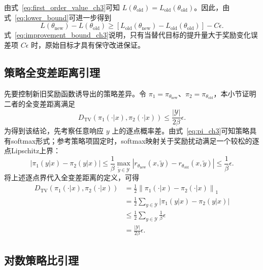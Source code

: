 由式~\eqref{eq:first_order_value_ch3}可知 $L(\theta_{\mathrm{old}})=L_{\mathrm{old}}(\theta_{\mathrm{old}})$。因此，由式~\eqref{eq:lower_bound}可进一步得到
\begin{equation}
    L(\theta_{\mathrm{new}})-L(\theta_{\mathrm{old}})
    \ge
    \left[
    L_{\mathrm{old}}(\theta_{\mathrm{new}})
    -
    L_{\mathrm{old}}(\theta_{\mathrm{old}})
    \right]
    -
    C\epsilon .
    \label{eq:improvement_bound_ch3}
\end{equation}
式~\eqref{eq:improvement_bound_ch3}说明，只有当替代目标的提升量大于奖励变化误差项 $C\epsilon$ 时，原始目标才具有保守改进保证。

\subsection{策略全变差距离引理}

先要控制新旧奖励函数诱导出的策略差异。令 $\pi_1=\pi_{\theta_{\mathrm{new}}}$、$\pi_2=\pi_{\theta_{\mathrm{old}}}$，本小节证明二者的全变差距离满足
\begin{equation}
    D_{\mathrm{TV}}\left(\pi_1(\cdot|x),\pi_2(\cdot|x)\right)
    \le \frac{|\mathcal{Y}|}{2\beta}\epsilon.
\end{equation}
为得到该结论，先考察任意响应 $y$ 上的逐点概率差。由式~\eqref{eq:pi_ch3}可知策略具有softmax形式；参考策略项固定时，softmax映射关于奖励扰动满足一个较松的逐点Lipschitz上界：
\begin{equation}
    \left|\pi_1(y|x)-\pi_2(y|x)\right|
    \le \frac{1}{\beta}\max_{\tilde{y}\in\mathcal{Y}}
    \left|r_{\theta_{\mathrm{new}}}(x,\tilde{y})-r_{\theta_{\mathrm{old}}}(x,\tilde{y})\right|
    \le \frac{1}{\beta}\epsilon.
\end{equation}
将上述逐点界代入全变差距离的定义，可得
\begin{equation}
\begin{aligned}
D_{\mathrm{TV}}\left(\pi_1(\cdot|x),\pi_2(\cdot|x)\right)
&=\frac{1}{2}\left\|\pi_1(\cdot|x)-\pi_2(\cdot|x)\right\|_1\\
&=\frac{1}{2}\sum_{y\in\mathcal{Y}}\left|\pi_1(y|x)-\pi_2(y|x)\right|\\
&\le \frac{1}{2}\sum_{y\in\mathcal{Y}}\frac{1}{\beta}\epsilon\\
&= \frac{|\mathcal{Y}|}{2\beta}\epsilon.
\end{aligned}
\label{eq:tv_bound}
\end{equation}

\subsection{对数策略比引理}

